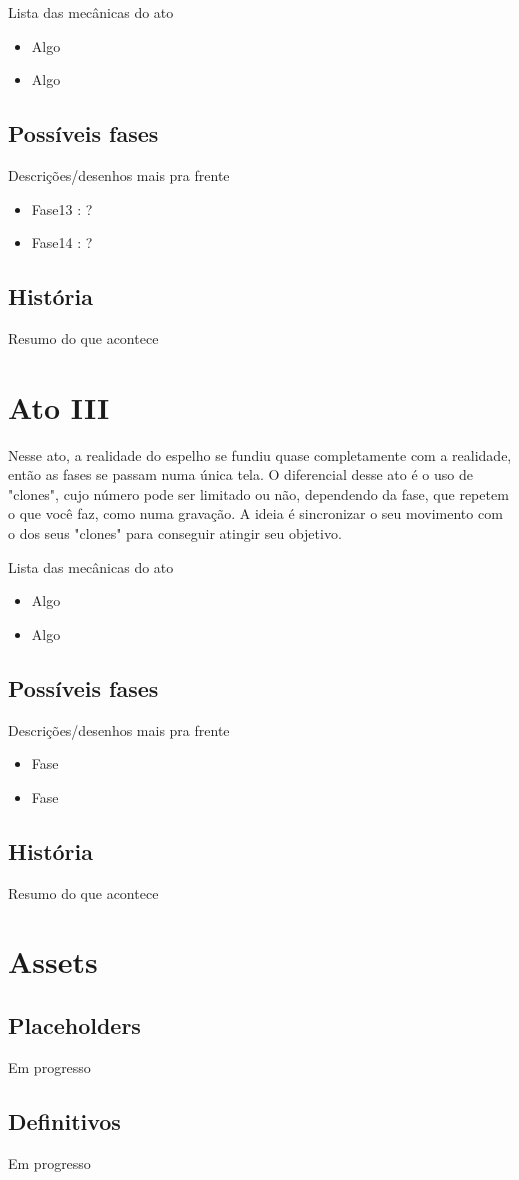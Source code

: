 \documentclass[a4paper, 11pt]{article}
\begin{document}
	Lista das mecânicas do ato 
	\begin{itemize} 
		\item Algo 
		\item Algo 
	\end{itemize} 
 
\subsection{Possíveis fases} 
 
	Descrições/desenhos mais pra frente 
	\begin{itemize} 
		\item Fase13 : ?
		\item Fase14 : ?
	\end{itemize} 
 
\subsection{História} 
 
	Resumo do que acontece 
 
\section{Ato III} 
 
	Nesse ato, a realidade do espelho se fundiu quase completamente com a realidade, então as fases se passam numa única 
	tela. O diferencial desse ato é o uso de "clones", cujo número pode ser limitado ou não, dependendo da fase, que repetem o que você faz, como numa gravação. A ideia é sincronizar o seu movimento com o dos seus "clones" para conseguir atingir seu objetivo. 
 
	Lista das mecânicas do ato 
	\begin{itemize} 
		\item Algo 
		\item Algo 
	\end{itemize} 
 
\subsection{Possíveis fases} 
 
	Descrições/desenhos mais pra frente 
	\begin{itemize} 
		\item Fase 
		\item Fase 
	\end{itemize} 
 
\subsection{História} 
 
	Resumo do que acontece 
 
\section{Assets} 
 
\subsection{Placeholders} 
	Em progresso 
 
\subsection{Definitivos} 
	Em progresso 
 
\end{document}
